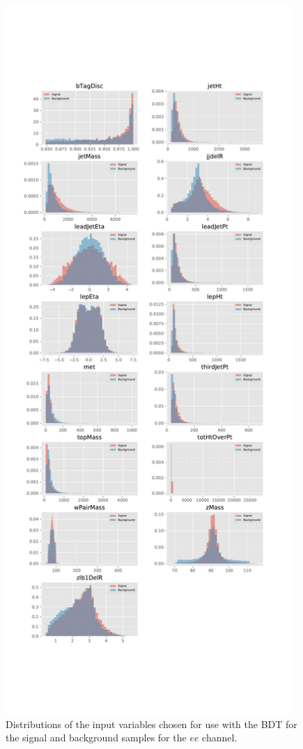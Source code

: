 \begin{figure}[htbp]
\centering
\includegraphics[width=0.97\textwidth]{figs/background-estimation/plots/vars_mumu.pdf}
\caption{
Distributions of the input variables chosen for use with the BDT for the signal and background samples for the $ee$ channel.}
\label{fig:inputFeaturesDistributions_mumu}
\end{figure}
